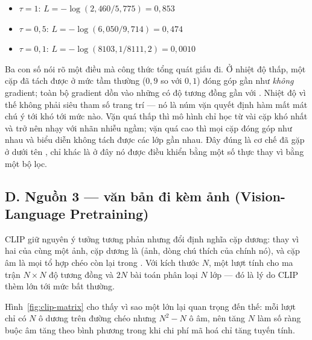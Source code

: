 \documentclass[../../../deep_learning.tex]{subfiles}
\begin{document}
\begin{itemize}
\item $\tau = 1$: \quad $L = -\log(2{,}460/5{,}775) = 0{,}853$
\item $\tau = 0{,}5$: \quad $L = -\log(6{,}050/9{,}714) = 0{,}474$
\item $\tau = 0{,}1$: \quad $L = -\log(8103{,}1/8111{,}2) = 0{,}0010$
\end{itemize}

Ba con số nói rõ một điều mà công thức tổng quát giấu đi. Ở nhiệt độ thấp, một cặp đã tách được ở mức tầm thường ($0{,}9$ so với $0{,}1$) đóng góp gần như \emph{không} gradient; toàn bộ gradient dồn vào những  có độ tương đồng gần với . Nhiệt độ vì thế không phải siêu tham số trang trí --- nó là núm vặn quyết định hàm mất mát chú ý tới  khó tới mức nào. Vặn quá thấp thì mô hình chỉ học từ vài cặp khó nhất và trở nên nhạy với nhãn nhiễu ngầm; vặn quá cao thì mọi cặp đóng góp như nhau và biểu diễn không tách được các lớp gần nhau. Đây đúng là cơ chế đã gặp ở  dưới tên , chỉ khác là ở đây nó được điều khiển bằng một số thực thay vì bằng một bộ lọc.


\subsection{D. Nguồn 3 --- văn bản đi kèm ảnh (Vision-Language Pretraining)}
CLIP giữ nguyên ý tưởng tương phản nhưng đổi định nghĩa cặp dương: thay vì hai  của cùng một ảnh, cặp dương là (ảnh, dòng chú thích của chính nó), và cặp âm là mọi tổ hợp chéo còn lại trong . Với  kích thước $N$, một lượt tính cho ma trận $N \times N$ độ tương đồng và $2N$ bài toán phân loại $N$ lớp --- đó là lý do CLIP thèm  lớn tới mức bất thường.

Hình~\ref{fig:clip-matrix} cho thấy vì sao một  lớn lại quan trọng đến thế: mỗi lượt chỉ có $N$ ô dương trên đường chéo nhưng $N^2 - N$ ô âm, nên tăng $N$ làm số ràng buộc âm tăng theo bình phương trong khi chi phí mã hoá chỉ tăng tuyến tính.
\end{document}

